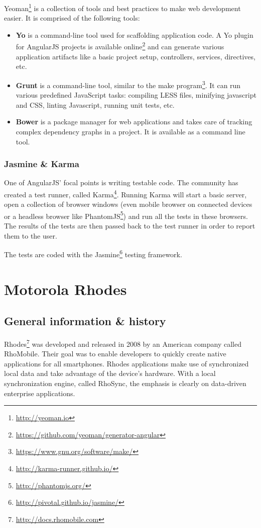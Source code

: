 Yeoman\footnote{\url{http://yeoman.io}} is a collection of tools and best practices to make web development easier. It is comprised of the following tools:
\begin{itemize}
    \item \textbf{Yo} is a command-line tool used for scaffolding application code. A Yo plugin for AngularJS projects is available online\footnote{\url{https://github.com/yeoman/generator-angular}} and can generate various application artifacts like a basic project setup, controllers, services, directives, etc.
    \item \textbf{Grunt} is a command-line tool, similar to the make program\footnote{\url{https://www.gnu.org/software/make/}}. It can run various predefined JavaScript tasks: compiling LESS files, minifying javascript and CSS, linting Javascript, running unit tests, etc.
    \item \textbf{Bower} is a package manager for web applications and takes care of tracking complex dependency graphs in a project. It is available as a command line tool.
\end{itemize}

\subsubsection{Jasmine \& Karma}

One of AngularJS' focal points is writing testable code. The community has created a test runner, called Karma\footnote{\url{http://karma-runner.github.io/}}. Running Karma will start a basic server, open a collection of browser windows (even mobile browser on connected devices or a headless browser like PhantomJS\footnote{\url{http://phantomjs.org/}}) and run all the tests in these browsers. The results of the tests are then passed back to the test runner in order to report them to the user. 

The tests are coded with the Jasmine\footnote{\url{http://pivotal.github.io/jasmine/}} testing framework.

\section{Motorola Rhodes}

\subsection{General information \& history}

Rhodes\footnote{\url{http://docs.rhomobile.com}} was developed and released in 2008 by an American company called RhoMobile. Their goal was to enable developers to quickly create native applications for all smartphones. Rhodes applications make use of synchronized local data and take advantage of the device's hardware. With a local synchronization engine, called RhoSync, the emphasis is clearly on data-driven enterprise applications.

